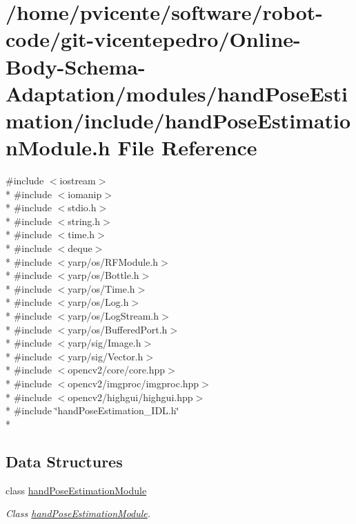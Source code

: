 \section{/home/pvicente/software/robot-\/code/git-\/vicentepedro/\+Online-\/\+Body-\/\+Schema-\/\+Adaptation/modules/hand\+Pose\+Estimation/include/hand\+Pose\+Estimation\+Module.h File Reference}
\label{handPoseEstimationModule_8h}
{\ttfamily \#include $<$iostream$>$}\\*
{\ttfamily \#include $<$iomanip$>$}\\*
{\ttfamily \#include $<$stdio.\+h$>$}\\*
{\ttfamily \#include $<$string.\+h$>$}\\*
{\ttfamily \#include $<$time.\+h$>$}\\*
{\ttfamily \#include $<$deque$>$}\\*
{\ttfamily \#include $<$yarp/os/\+R\+F\+Module.\+h$>$}\\*
{\ttfamily \#include $<$yarp/os/\+Bottle.\+h$>$}\\*
{\ttfamily \#include $<$yarp/os/\+Time.\+h$>$}\\*
{\ttfamily \#include $<$yarp/os/\+Log.\+h$>$}\\*
{\ttfamily \#include $<$yarp/os/\+Log\+Stream.\+h$>$}\\*
{\ttfamily \#include $<$yarp/os/\+Buffered\+Port.\+h$>$}\\*
{\ttfamily \#include $<$yarp/sig/\+Image.\+h$>$}\\*
{\ttfamily \#include $<$yarp/sig/\+Vector.\+h$>$}\\*
{\ttfamily \#include $<$opencv2/core/core.\+hpp$>$}\\*
{\ttfamily \#include $<$opencv2/imgproc/imgproc.\+hpp$>$}\\*
{\ttfamily \#include $<$opencv2/highgui/highgui.\+hpp$>$}\\*
{\ttfamily \#include \char`\"{}hand\+Pose\+Estimation\+\_\+\+I\+D\+L.\+h\char`\"{}}\\*
\subsection*{Data Structures}
\begin{DoxyCompactItemize}
\item 
class \hyperlink{classhandPoseEstimationModule}{hand\+Pose\+Estimation\+Module}
\begin{DoxyCompactList}\small\item\em Class \hyperlink{classhandPoseEstimationModule}{hand\+Pose\+Estimation\+Module}. \end{DoxyCompactList}\end{DoxyCompactItemize}


